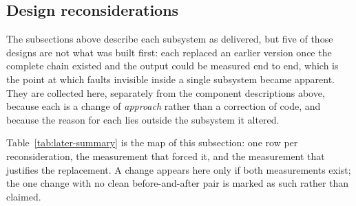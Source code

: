 \subsection{Design reconsiderations}
\label{sec:later}

The subsections above describe each subsystem as delivered, but five of those designs are not what was built first: each replaced an earlier version once the complete chain existed and the output could be measured end to end, which is the point at which faults invisible inside a single subsystem became apparent. They are collected here, separately from the component descriptions above, because each is a change of \emph{approach} rather than a correction of code, and because the reason for each lies outside the subsystem it altered.

Table~\ref{tab:later-summary} is the map of this subsection: one row per reconsideration, the measurement that forced it, and the measurement that justifies the replacement. A change appears here only if both measurements exist; the one change with no clean before-and-after pair is marked as such rather than claimed.

